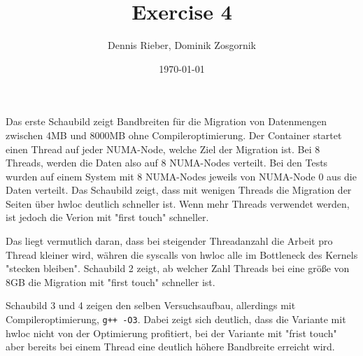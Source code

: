 \documentclass{scrartcl}
\title{Exercise 4}
\author{Dennis Rieber, Dominik Zosgornik}
\date{\today}
\begin{document}
Das erste Schaubild zeigt Bandbreiten für die Migration von Datenmengen zwischen 4MB und 8000MB ohne Compileroptimierung. Der Container startet einen Thread auf jeder NUMA-Node, welche Ziel der Migration ist. Bei 8 Threads, werden die Daten also auf 8 NUMA-Nodes verteilt. Bei den Tests wurden auf einem System mit 8 NUMA-Nodes jeweils von NUMA-Node 0 aus die Daten verteilt. Das Schaubild zeigt, dass mit wenigen Threads die Migration der Seiten über hwloc deutlich schneller ist. Wenn mehr Threads verwendet werden, ist jedoch die Verion mit "first touch" schneller.

Das liegt vermutlich daran, dass bei steigender Threadanzahl die Arbeit pro Thread kleiner wird, währen die syscalls von hwloc alle im Bottleneck des Kernels "stecken bleiben". Schaubild 2 zeigt, ab welcher Zahl Threads bei eine größe von 8GB die Migration mit "first touch" schneller ist.

Schaubild 3 und 4 zeigen den selben Versuchsaufbau, allerdings mit Compileroptimierung, \verb|g++ -O3|. Dabei zeigt sich deutlich, dass die Variante mit hwloc nicht von der Optimierung profitiert, bei der Variante mit "frist touch" aber bereits bei einem Thread eine deutlich höhere Bandbreite erreicht wird.
\end{document}
